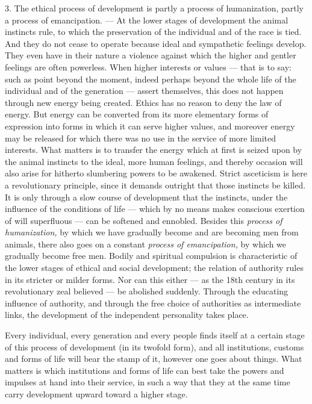 \documentclass[12pt,a4paper,openany]{book}
\newcommand{\opage}[1]{\marginnote{\footnotesize\textit{[#1]}}}
\begin{document}
3. The ethical process of development is partly a process of humanization, partly a process of emancipation. --- At the
lower stages of development the animal instincts rule, to which the preservation of the individual and of the race is
tied. And they do not cease to operate because ideal and sympathetic feelings develop. They even have in their nature a
violence against which the higher and gentler feelings are often powerless. When higher interests or
\opage{266}values --- that is to say: such as point beyond the moment, indeed perhaps beyond the whole life of the
individual and of the generation --- assert themselves, this does not happen through new energy being created. Ethics
has no reason to deny the law of energy. But energy can be converted from its more elementary forms of expression into
forms in which it can serve higher values, and moreover energy may be released for which there was no use in the
service of more limited interests. What matters is to transfer the energy which at first is seized upon by the animal
instincts to the ideal, more human feelings, and thereby occasion will also arise for hitherto slumbering powers to be
awakened. Strict asceticism is here a revolutionary principle, since it demands outright that those instincts be
killed. It is only through a slow course of development that the instincts, under the influence of the conditions of
life --- which by no means makes conscious exertion of will superfluous --- can be softened and ennobled. Besides this
\textit{process of humanization,} by which we have gradually become and are becoming men from animals, there also goes
on a constant \textit{process of emancipation,} by which we gradually become free men. Bodily and spiritual compulsion
is characteristic of the lower stages of ethical and social development; the relation of authority rules in its
stricter or milder forms. Nor can this either --- as the 18th century in its revolutionary zeal believed --- be
abolished suddenly. Through the educating influence of authority, and through the free choice of authorities as
intermediate links, the development of the independent personality takes place.

Every individual, every generation and every people finds itself at a certain stage of this process of development (in
its twofold form), and all institutions, customs and forms of life will bear the stamp of it, however one goes about
things. What matters is which institutions and forms of life can best take the powers and impulses at hand into their
service, in such a way that they at the same time carry development upward toward a higher stage.
\end{document}
